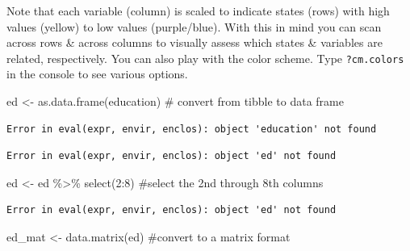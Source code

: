\documentclass[
  letterpaper,
  DIV=11,
  numbers=noendperiod]{scrreprt}
\newenvironment{Shaded}{\begin{snugshade}}{\end{snugshade}}
\newcommand{\CommentTok}[1]{\textcolor[rgb]{0.37,0.37,0.37}{#1}}
\newcommand{\DecValTok}[1]{\textcolor[rgb]{0.68,0.00,0.00}{#1}}
\newcommand{\FunctionTok}[1]{\textcolor[rgb]{0.28,0.35,0.67}{#1}}
\newcommand{\NormalTok}[1]{\textcolor[rgb]{0.00,0.23,0.31}{#1}}
\newcommand{\OtherTok}[1]{\textcolor[rgb]{0.00,0.23,0.31}{#1}}
\newcommand{\SpecialCharTok}[1]{\textcolor[rgb]{0.37,0.37,0.37}{#1}}
\begin{document}
Note that each variable (column) is scaled to indicate states (rows)
with high values (yellow) to low values (purple/blue). With this in mind
you can scan across rows \& across columns to visually assess which
states \& variables are related, respectively. You can also play with
the color scheme. Type \texttt{?cm.colors} in the console to see various
options.

\begin{Shaded}
\begin{Highlighting}[]
\NormalTok{ed }\OtherTok{\textless{}{-}} \FunctionTok{as.data.frame}\NormalTok{(education) }\CommentTok{\# convert from tibble to data frame}
\end{Highlighting}
\end{Shaded}

\begin{verbatim}
Error in eval(expr, envir, enclos): object 'education' not found
\end{verbatim}

\begin{Shaded}
\end{Shaded}

\begin{verbatim}
Error in eval(expr, envir, enclos): object 'ed' not found
\end{verbatim}

\begin{Shaded}
\begin{Highlighting}[]
\NormalTok{ed }\OtherTok{\textless{}{-}}\NormalTok{ ed }\SpecialCharTok{\%\textgreater{}\%} \FunctionTok{select}\NormalTok{(}\DecValTok{2}\SpecialCharTok{:}\DecValTok{8}\NormalTok{) }\CommentTok{\#select the 2nd through 8th columns}
\end{Highlighting}
\end{Shaded}

\begin{verbatim}
Error in eval(expr, envir, enclos): object 'ed' not found
\end{verbatim}

\begin{Shaded}
\begin{Highlighting}[]
\NormalTok{ed\_mat }\OtherTok{\textless{}{-}} \FunctionTok{data.matrix}\NormalTok{(ed) }\CommentTok{\#convert to a matrix format}
\end{Highlighting}
\end{Shaded}
\end{document}
